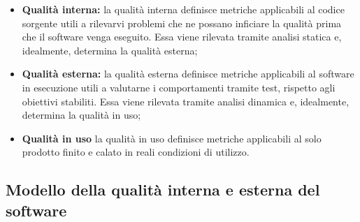 \documentclass[openany,12pt,a4paper]{report}
\begin{document}
\begin{itemize}
    \item \textbf{Qualità interna:} la qualità interna definisce metriche applicabili al codice sorgente utili a rilevarvi problemi che ne possano inficiare la qualità prima che il software venga eseguito. Essa viene rilevata tramite analisi statica e, idealmente, determina la qualità esterna;
    
    \item \textbf{Qualità esterna:} la qualità esterna definisce metriche applicabili al software in esecuzione utili a valutarne i comportamenti tramite test, rispetto agli obiettivi stabiliti. Essa viene rilevata tramite analisi dinamica e, idealmente, determina la qualità in uso;
    
    \item \textbf{Qualità in uso} la qualità in uso definisce metriche applicabili al solo prodotto finito e calato in reali condizioni di utilizzo.
\end{itemize}

\subsection{Modello della qualità interna e esterna del software}
\end{document}
